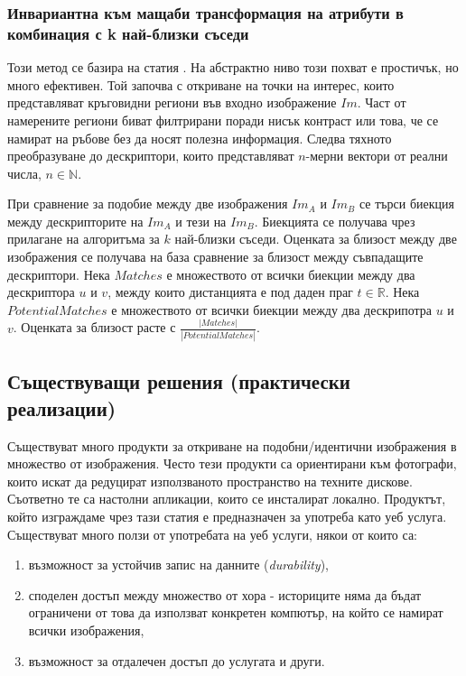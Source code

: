 \documentclass[a4paper,12pt]{article}
\begin{document}
\subsubsection{Инвариантна към мащаби трансформация на атрибути в комбинация с k най-близки съседи}

Този метод се базира на статия \cite{sift}. На абстрактно ниво този похват е простичък, но много ефективен. Той започва с откриване на точки на интерес, които представляват кръговидни региони във входно изображение $Im$. Част от намерените региони биват филтрирани поради нисък контраст или това, че се намират на ръбове без да носят полезна информация. Следва тяхното преобразуване до дескриптори, които представляват $n$-мерни вектори от реални числа, $n \in \mathbb{N}$.

\bigbreak

При сравнение за подобие между две изображения $Im_A$ и $Im_B$ се търси биекция между дескрипторите на $Im_A$ и тези на $Im_B$. Биекцията се получава чрез прилагане на алгоритъма за $k$ най-близки съседи. Оценката за близост между две изображения се получава на база сравнение за близост между съвпадащите дескриптори. Нека $Matches$ е множеството от всички биекции между два дескриптора $u$ и $v$, между които дистанцията е под даден праг $t \in \mathbb{R}$. Нека $PotentialMatches$ е множеството от всички биекции между два дескрипотра $u$ и $v$. Оценката за близост расте с $\frac{|Matches|}{|PotentialMatches|}$.

\subsection{Съществуващи решения (практически реализации)}

Съществуват много продукти за откриване на подобни/идентични изображения в множество от изображения. Често тези продукти са ориентирани към фотографи, които искат да редуцират използваното пространство на техните дискове. Съответно те са настолни апликации, които се инсталират локално. Продуктът, който изграждаме чрез тази статия е предназначен за употреба като уеб услуга. Съществуват много ползи от употребата на уеб услуги, някои от които са:

\begin{enumerate}
    \item възможност за устойчив запис на данните (\textit{durability}),
    \item споделен достъп между множество от хора - историците няма да бъдат ограничени от това да използват конкретен компютър, на който се намират всички изображения,
    \item възможност за отдалечен достъп до услугата и други.
\end{enumerate}
\end{document}
